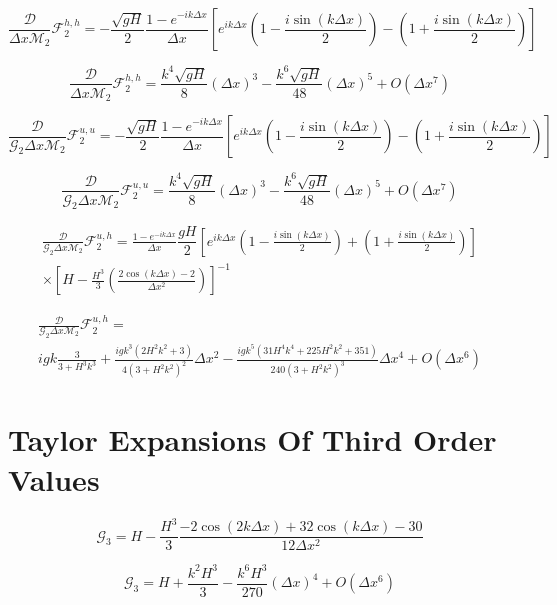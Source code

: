 \documentclass[12pt]{article}
\begin{document}
\[\frac{\mathcal{D}}{\Delta x\mathcal{M}_2} \mathcal{F}^{h,h}_2 = -\dfrac{ \sqrt{gH}}{ 2} \frac{1 -e^{-ik\Delta x}}{\Delta x} \left [ e^{ik\Delta x}\left(1  - \frac{i\sin\left(k\Delta x\right)}{2} \right)-  \left(1  + \frac{i\sin\left(k\Delta x\right)}{2} \right) \right ]\]

\[\frac{\mathcal{D}}{\Delta x\mathcal{M}_2} \mathcal{F}^{h,h}_2 = \frac{k^4\sqrt{gH} }{8} (\Delta x)^3  - \frac{k^6\sqrt{gH}}{48} (\Delta x)^5 + O(\Delta x^7) \]

\[
\frac{\mathcal{D}}{\mathcal{G}_2\Delta x\mathcal{M}_2}\mathcal{F}^{u,u}_2 =  - \dfrac{ \sqrt{gH}}{ 2}\frac{1 -e^{-ik\Delta x}}{\Delta x} \left[ e^{ik\Delta x}\left(1  - \frac{i\sin\left(k\Delta x\right)}{2} \right)-  \left(1  + \frac{i\sin\left(k\Delta x\right)}{2} \right) \right]
\]

\[
\frac{\mathcal{D}}{\mathcal{G}_2\Delta x\mathcal{M}_2}\mathcal{F}^{u,u}_2 =  \frac{k^4\sqrt{gH} }{8} (\Delta x)^3  - \frac{k^6\sqrt{gH}}{48} (\Delta x)^5 + O(\Delta x^7) 
\]


\begin{multline*}
\frac{\mathcal{D}}{\mathcal{G}_2\Delta x\mathcal{M}_2}\mathcal{F}^{u,h}_2 =  \frac{1 -e^{-ik\Delta x}}{\Delta x} \dfrac{ gH}{ 2} \left[ e^{ik\Delta x}\left(1  - \frac{i\sin\left(k\Delta x\right)}{2} \right) +   \left(1  + \frac{i\sin\left(k\Delta x\right)}{2} \right) \right] \\ \times \left[H - \frac{H^3}{3}\left(\frac{ 2\cos\left(k\Delta x\right) - 2 }{\Delta x^2}\right)\right]^{-1}
\end{multline*}

\begin{multline*}
\frac{\mathcal{D}}{\mathcal{G}_2\Delta x\mathcal{M}_2}\mathcal{F}^{u,h}_2 = \\ igk\frac{3}{3 + H^3k^3} + \frac{igk^3\left(2H^2k^2 + 3\right)}{4\left(3 + H^2k^2\right)^2}\Delta x ^2 - \frac{igk^5\left(31H^4k^4 + 225H^2k^2  +351\right)}{240\left(3 + H^2k^2\right)^3}\Delta x ^4 + O(\Delta x^6)
\end{multline*}


\section{Taylor Expansions Of Third Order Values }

\[\mathcal{G}_3 = H -\frac{H^3}{3} \frac{-2\cos\left(2k\Delta x\right) + 32\cos\left(k\Delta x\right)  - 30 }{12\Delta x^2}\]

\[\mathcal{G}_3 = H + \frac{ k^2H^3}{3} -\frac{ k^6 H^3}{270} (\Delta x)^4 + O(\Delta x^{6}) \]
\end{document}
